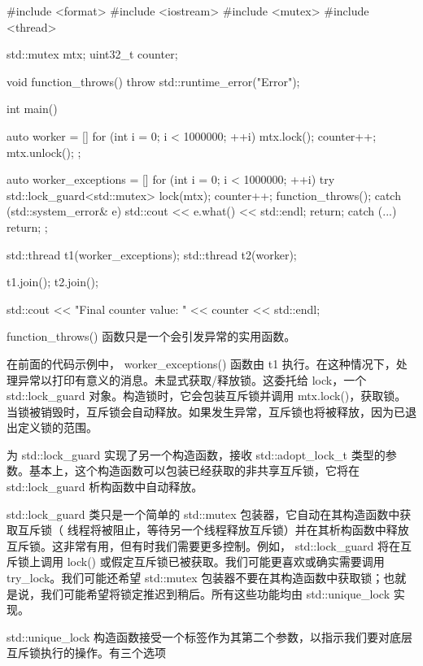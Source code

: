 \begin{cpp}
#include <format>
#include <iostream>
#include <mutex>
#include <thread>

std::mutex mtx;
uint32_t counter{};

void function_throws() { throw std::runtime_error("Error"); }

int main() {
    auto worker = [] {
        for (int i = 0; i < 1000000; ++i) {
            mtx.lock();
            counter++;
            mtx.unlock();
        }
    };

    auto worker_exceptions = [] {
        for (int i = 0; i < 1000000; ++i) {
            try {
                std::lock_guard<std::mutex> lock(mtx);
                counter++;
                function_throws();
            } catch (std::system_error& e) {
                std::cout << e.what() << std::endl;
                return;
            } catch (...) {
                return;
            }
        }
    };

    std::thread t1(worker_exceptions);
    std::thread t2(worker);

    t1.join();
    t2.join();

    std::cout << "Final counter value: " << counter << std::endl;
}
\end{cpp}

function\_throws() 函数只是一个会引发异常的实用函数。

在前面的代码示例中， worker\_exceptions() 函数由 t1 执行。在这种情况下，处理异常以打印有意义的消息。未显式获取/释放锁。这委托给 lock，一个 std::lock\_guard 对象。构造锁时，它会包装互斥锁并调用 mtx.lock()，获取锁。当锁被销毁时，互斥锁会自动释放。如果发生异常，互斥锁也将被释放，因为已退出定义锁的范围。

为 std::lock\_guard 实现了另一个构造函数，接收 std::adopt\_lock\_t 类型的参数。基本上，这个构造函数可以包装已经获取的非共享互斥锁，它将在 std::lock\_guard 析构函数中自动释放。


std::lock\_guard 类只是一个简单的 std::mutex 包装器，它自动在其构造函数中获取互斥锁（ 线程将被阻止，等待另一个线程释放互斥锁）并在其析构函数中释放互斥锁。这非常有用，但有时我们需要更多控制。例如， std::lock\_guard 将在互斥锁上调用 lock() 或假定互斥锁已被获取。我们可能更喜欢或确实需要调用 try\_lock。我们可能还希望 std::mutex 包装器不要在其构造函数中获取锁；也就是说，我们可能希望将锁定推迟到稍后。所有这些功能均由 std::unique\_lock 实现。

std::unique\_lock 构造函数接受一个标签作为其第二个参数，以指示我们要对底层互斥锁执行的操作。有三个选项

